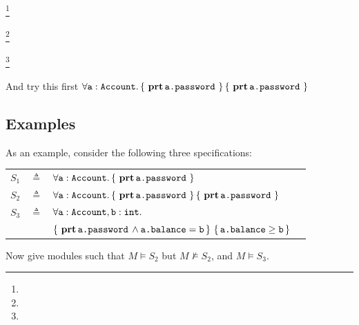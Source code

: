   \footnote{}%
  
 
  
  \footnote{}
 
\footnote{}




And try this first $\forall {{\texttt{a}}:{\texttt{Account}}}.\, {\{}\, {\, \mathbf{prt}\, {\texttt{a.password}}\, } \,{\}} \,{\{}\, {\, \mathbf{prt}\, {\texttt{a.password}}\, } \,{\}}$

\subsection{Examples}
\noindent
As an example, consider the following three  specifications:

\begin{tabular}{lcll}
$S_1$   &     $\triangleq$   & $\forall {{\texttt{a}}:{\texttt{Account}} }.\, {\{}\, {\, \mathbf{prt}\, {\texttt{a.password}}\, } \,{\}}  $
 \\
 $S_2$   & $\triangleq$   &  $\forall {{\texttt{a}}:{\texttt{Account}}}.\, {\{}\, {\, \mathbf{prt}\, {\texttt{a.password}}\, } \,{\}} \,{\{}\, {\, \mathbf{prt}\, {\texttt{a.password}}\, } \,{\}}$
 \\
$S_3$ & $\triangleq$   &
  $\forall {\texttt{a}}:{\texttt{Account}},{\texttt{b}}:{\texttt{int}}.$\\
  &  &  ${\{}\, {\, \mathbf{prt}\, {\texttt{a.password}}\, } \wedge {\texttt{a.balance}}={\texttt{b}} \,{\}}  
\  {\{}\,  {\texttt{a.balance}}\geq {\texttt{b}}  \,{\}}$
\end{tabular}

Now give modules such that $M \models S_2$ but $M \not\models S_2$, and $M \models S_3$.


